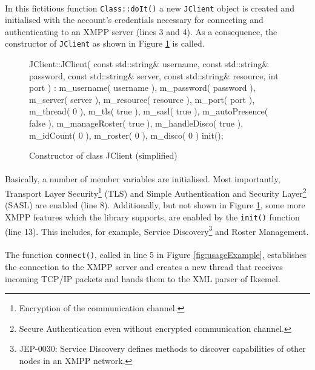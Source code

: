 \paragraph{}
In this fictitious function \texttt{Class::doIt()} a new \texttt{JClient} object is created and initialised with the account's credentials necessary for connecting and authenticating to an XMPP server (lines 3 and 4). As a consequence, the constructor of \texttt{JClient} as shown in Figure \ref{fig:JClientConstructor} is called.

\begin{figure}[H]
\begin{listing}{1}
JClient::JClient( const std::string& username,
                  const std::string& password,
                  const std::string& server,
                  const std::string& resource, int port )
  : m_username( username ), m_password( password ),
  m_server( server ), m_resource( resource ),
  m_port( port ), m_thread( 0 ),
  m_tls( true ), m_sasl( true ),
  m_autoPresence( false ), m_manageRoster( true ),
  m_handleDisco( true ), m_idCount( 0 ), m_roster( 0 ),
  m_disco( 0 )
{
  init();
}
\end{listing}
\caption{Constructor of class JClient (simplified)}
\label{fig:JClientConstructor}
\end{figure}

\paragraph{}
Basically, a number of member variables are initialised. Most importantly, Transport Layer Security\footnote{Encryption of the communication channel.} (TLS) \cite{rfc2246} and Simple Authentication and Security Layer\footnote{Secure Authentication even without encrypted communication channel.} (SASL) \cite{rfc2222} are enabled (line 8). Additionally, but not shown in Figure \ref{fig:JClientConstructor}, some more XMPP features which the library supports, are enabled by the \texttt{init()} function (line 13). This includes, for example, Service Discovery\footnote{JEP-0030: Service Discovery defines methods to discover capabilities of other nodes in an XMPP network.} \cite{jep0030} and Roster Management.

\paragraph{}
The function \texttt{connect()}, called in line 5 in Figure \ref{fig:usageExample}, establishes the connection to the XMPP server and creates a new thread that receives incoming TCP/IP packets and hands them to the XML parser of Iksemel.

